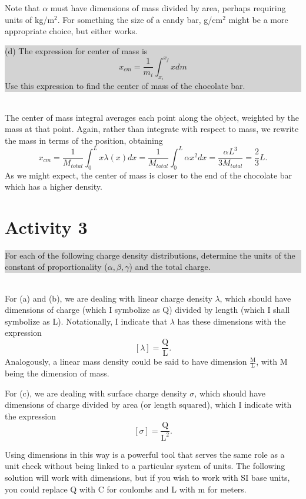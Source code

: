 \documentclass[]{article}
\newcommand{\excerpt}[1]{\colorbox{lightgray}{\parbox{14.8cm}{#1}} \\}
\begin{document}
Note that $\alpha$ must have dimensions of mass divided by area, perhaps requiring units of kg/m$^{2}$. For something the size of a candy bar, g/cm$^{2}$ might be a more appropriate choice, but either works. \\
\excerpt{
(d) The expression for center of mass is 
\begin{equation}
	x_{cm} = \frac{1}{m_i}\int_{x_i}^{x_f} x dm
\end{equation}
Use this expression to find the center of mass of the chocolate bar.
}
The center of mass integral averages each point along the object, weighted by the mass at that point. Again, rather than integrate with respect to mass, we rewrite the mass in terms of the position, obtaining
\[
x_{cm} = \frac{1}{M_{total}}\int_{0}^{L} x \lambda(x) dx = \frac{1}{M_{total}}\int_{0}^{L} \alpha x^{2} dx = \frac{\alpha L^{3}}{3M_{total}} = \frac{2}{3}L.
\]
As we might expect, the center of mass is closer to the end of the chocolate bar which has a higher density.

\section*{Activity 3}
\excerpt{
For each of the following charge density distributions, determine the units of the constant of proportionality ($\alpha, \beta, \gamma$) and the total charge.
}
For (a) and (b), we are dealing with linear charge density $\lambda$, which should have dimensions of charge (which I symbolize as Q) divided by length (which I shall symbolize as L). Notationally, I indicate that $\lambda$ has these dimensions with the expression
\[
[\lambda] = \frac{\text{Q}}{\text{L}}.
\]
Analogously, a linear mass density could be said to have dimension $\frac{\text{M}}{\text{L}}$, with M being the dimension of mass.

For (c), we are dealing with surface charge density $\sigma$, which should have dimensions of charge divided by area (or length squared), which I indicate with the expression
\[
[\sigma] = \frac{\text{Q}}{\text{L}^{2}}.
\]

Using dimensions in this way is a powerful tool that serves the same role as a unit check without being linked to a particular system of units. The following solution will work with dimensions, but if you wish to work with SI base units, you could replace Q with C for coulombs and L with m for meters.
\end{document}

